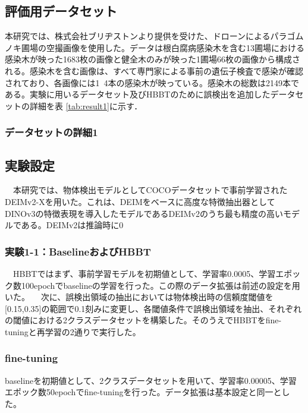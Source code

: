     
\subsection{評価用データセット}
 本研究では、株式会社ブリヂストンより提供を受けた、ドローンによるパラゴムノキ圃場の空撮画像を使用した。データは根白腐病感染木を含む13圃場における感染木が映った1683枚の画像と健全木のみが映った1圃場66枚の画像から構成される。感染木を含む画像は、すべて専門家による事前の遺伝子検査で感染が確認されており、各画像には1~4本の感染木が映っている。感染木の総数は2149本である。実験に用いるデータセット及びHBBTのために誤検出を追加したデータセットの詳細を表 \ref{tab:result1}に示す．

\subsubsection{データセットの詳細1}

        
\subsection{実験設定}
　本研究では、物体検出モデルとしてCOCOデータセットで事前学習されたDEIMv2-Xを用いた。これは、DEIMをベースに高度な特徴抽出器としてDINOv3の特徴表現を導入したモデルであるDEIMv2のうち最も精度の高いモデルである。DEIMv2は推論時に0%
\subsubsection{実験1-1：BaselineおよびHBBT}
　HBBTではまず、事前学習モデルを初期値として、学習率0.0005、学習エポック数100epochでbaselineの学習を行った。この際のデータ拡張は前述の設定を用いた。
　次に、誤検出領域の抽出においては物体検出時の信頼度閾値を[0.15,0.35]の範囲で0.1刻みに変更し、各閾値条件で誤検出領域を抽出、それぞれの閾値における2クラスデータセットを構築した。そのうえでHBBTをfine-tuningと再学習の2通りで実行した。
\subsubsection{fine-tuning}
 baselineを初期値として、2クラスデータセットを用いて、学習率0.00005、学習エポック数50epochでfine-tuningを行った。データ拡張は基本設定と同一とした。
